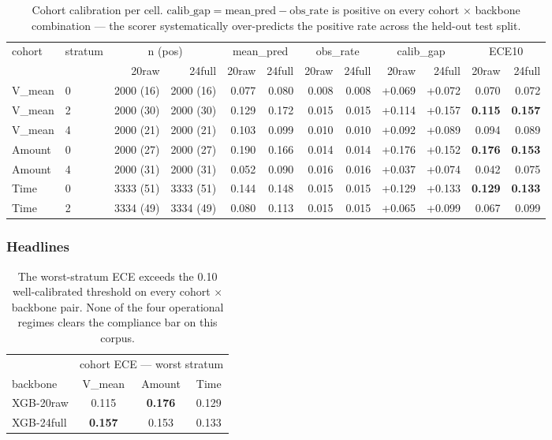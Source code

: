 \begin{table}[h]
\centering
\small
\begin{tabular}{llrr rrrr rrrr}
\toprule
cohort & stratum & \multicolumn{2}{c}{n (pos)} & \multicolumn{2}{c}{mean\_pred} & \multicolumn{2}{c}{obs\_rate} & \multicolumn{2}{c}{calib\_gap} & \multicolumn{2}{c}{ECE10} \\
\cmidrule(lr){3-4}\cmidrule(lr){5-6}\cmidrule(lr){7-8}\cmidrule(lr){9-10}\cmidrule(lr){11-12}
       &         & 20raw & 24full & 20raw & 24full & 20raw & 24full & 20raw & 24full & 20raw & 24full \\
\midrule
V\_mean & 0 & 2000 (16) & 2000 (16) & 0.077 & 0.080 & 0.008 & 0.008 & +0.069 & +0.072 & 0.070 & 0.072 \\
V\_mean & 2 & 2000 (30) & 2000 (30) & 0.129 & 0.172 & 0.015 & 0.015 & +0.114 & +0.157 & \textbf{0.115} & \textbf{0.157} \\
V\_mean & 4 & 2000 (21) & 2000 (21) & 0.103 & 0.099 & 0.010 & 0.010 & +0.092 & +0.089 & 0.094 & 0.089 \\
Amount & 0  & 2000 (27) & 2000 (27) & 0.190 & 0.166 & 0.014 & 0.014 & +0.176 & +0.152 & \textbf{0.176} & \textbf{0.153} \\
Amount & 4  & 2000 (31) & 2000 (31) & 0.052 & 0.090 & 0.016 & 0.016 & +0.037 & +0.074 & 0.042 & 0.075 \\
Time   & 0  & 3333 (51) & 3333 (51) & 0.144 & 0.148 & 0.015 & 0.015 & +0.129 & +0.133 & \textbf{0.129} & \textbf{0.133} \\
Time   & 2  & 3334 (49) & 3334 (49) & 0.080 & 0.113 & 0.015 & 0.015 & +0.065 & +0.099 & 0.067 & 0.099 \\
\bottomrule
\end{tabular}
\caption{Cohort calibration per cell. $\mathrm{calib\_gap} = \mathrm{mean\_pred} - \mathrm{obs\_rate}$ is positive on every cohort $\times$ backbone combination --- the scorer
systematically over-predicts the positive rate across the held-out test split.}
\label{tab:p8-cohort-calib}
\end{table}

\subsubsection{Headlines}
\begin{table}[h]
\centering
\small
\begin{tabular}{l ccc}
\toprule
& \multicolumn{3}{c}{cohort ECE --- worst stratum} \\
\cmidrule(lr){2-4}
backbone & V\_mean & Amount & Time \\
\midrule
XGB-20raw  & 0.115 & \textbf{0.176} & 0.129 \\
XGB-24full & \textbf{0.157} & 0.153 & 0.133 \\
\bottomrule
\end{tabular}
\caption{The worst-stratum ECE exceeds the 0.10 well-calibrated threshold on every cohort $\times$ backbone pair. None of the four operational regimes clears the compliance bar on this corpus.}
\label{tab:p8-cohort-headlines}
\end{table}

